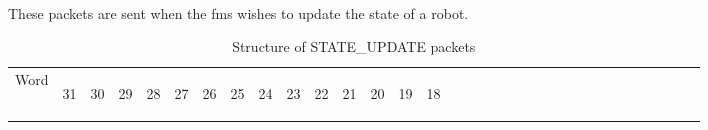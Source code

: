 \documentclass[11pt]{article}
\begin{document}
\paragraph{}
These packets are sent when the \acrshort{fms} wishes to update the state of a robot.
\newline
\begin{table}[h!]
    \centering
    \caption{Structure of STATE\_UPDATE packets}
    \label{tab:stateUpdateDef}
    \begin{tabular}{|p{1cm}|m{0.04cm}|m{0.04cm}|m{0.04cm}|m{0.04cm}|m{0.04cm}|m{0.04cm}|m{0.04cm}|m{0.04cm}|m{0.04cm}|
        m{0.04cm}|m{0.04cm}|m{0.04cm}|m{0.04cm}|m{0.04cm}|m{0.04cm}|m{0.04cm}|m{0.04cm}|m{0.04cm}|m{0.04cm}|m{0.04cm}|
        m{0.04cm}|m{0.04cm}|m{0.04cm}|m{0.04cm}|m{0.04cm}|m{0.04cm}|m{0.04cm}|m{0.04cm}|m{0.04cm}|m{0.04cm}|m{0.04cm}|m{0.04cm}|}
        \hline
        Word & 
        \begin{sideways}31\end{sideways} &
        \begin{sideways}30\end{sideways} & 
        \begin{sideways}29\end{sideways} &
        \begin{sideways}28\end{sideways} &
        \begin{sideways}27\end{sideways} &
        \begin{sideways}26\end{sideways} &
        \begin{sideways}25\end{sideways} &
        \begin{sideways}24\end{sideways} &
        \begin{sideways}23\end{sideways} &
        \begin{sideways}22\end{sideways} &
        \begin{sideways}21\end{sideways} &
        \begin{sideways}20\end{sideways} &
        \begin{sideways}19\end{sideways} &
        \begin{sideways}18\end{sideways} &

\end{tabular}
\end{table}
\end{document}
